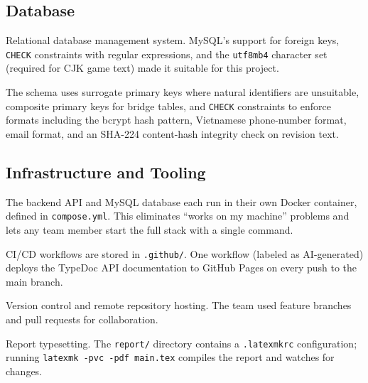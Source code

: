 \subsection{Database}

\begin{description}[leftmargin=2.2cm, style=nextline]
  \item[MySQL 8 (\texttt{mysql:oraclelinux9})] Relational database management system. MySQL's support for foreign keys, \texttt{CHECK} constraints with regular expressions, and the \texttt{utf8mb4} character set (required for CJK game text) made it suitable for this project.
  \item[Schema design] The schema uses surrogate primary keys where natural identifiers are unsuitable, composite primary keys for bridge tables, and \texttt{CHECK} constraints to enforce formats including the bcrypt hash pattern, Vietnamese phone-number format, email format, and an SHA-224 content-hash integrity check on revision text.
\end{description}

\subsection{Infrastructure and Tooling}

\begin{description}[leftmargin=2.2cm, style=nextline]
  \item[Docker \& Docker Compose] The backend API and MySQL database each run in their own Docker container, defined in \texttt{compose.yml}. This eliminates ``works on my machine'' problems and lets any team member start the full stack with a single command.
  \item[GitHub Actions] CI/CD workflows are stored in \texttt{.github/}. One workflow (labeled as AI-generated) deploys the TypeDoc API documentation to GitHub Pages on every push to the main branch.
  \item[Git / GitHub] Version control and remote repository hosting. The team used feature branches and pull requests for collaboration.
  \item[\LaTeX{} / latexmk] Report typesetting. The \texttt{report/} directory contains a \texttt{.latexmkrc} configuration; running \texttt{latexmk -pvc -pdf main.tex} compiles the report and watches for changes.
\end{description}
